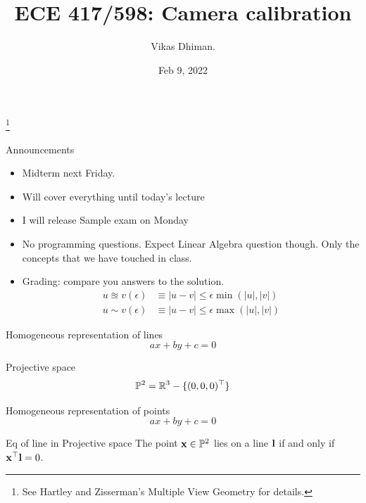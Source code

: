 \documentclass[times,t]{beamer}
\title{ECE 417/598: Camera calibration}
\author{Vikas Dhiman.  }
\date{Feb 9, 2022}
\begin{document}
\begin{frame}
  \titlepage
  \footnote{See Hartley  and Zisserman's Multiple   View  Geometry for  details.}
  \end{frame}

  \begin{frame}{Announcements}
    \begin{itemize}
      \item Midterm next Friday.
      \item Will cover everything until today's lecture
      \item I will release Sample exam on Monday
      \item No programming questions. Expect Linear Algebra question though.
        Only the concepts that we have touched in class. 
      \item Grading: compare you answers to the solution.
        \begin{align}
          u \approxeq v (\epsilon) &\equiv | u - v | \le \epsilon \min(|u|, |v|)
          \\
          u \sim v (\epsilon) &\equiv | u - v | \le \epsilon \max(|u|, |v|)
        \end{align}
    \end{itemize}
  \end{frame}
  
  \begin{frame}{Homogeneous representation of lines}
    \[ ax + by + c = 0\]
  \end{frame}

  \begin{frame}{Projective space}
    \[ \mathbb{P}^2 = \mathbb{R}^3 - \{  (0, 0, 0)^\top \}   \]
    \end{frame}

    \begin{frame}{Homogeneous representation of points}
      \[ ax + by + c = 0\]
    \end{frame}

\begin{frame}{Eq of line in Projective space}
      The point $\mathbf{x} \in \mathbb{P}^2$ lies on a line $\mathbf{l}$ if and only if
      $\mathbf{x}^\top \mathbf{l} = 0$.
\end{frame}
\end{document}
